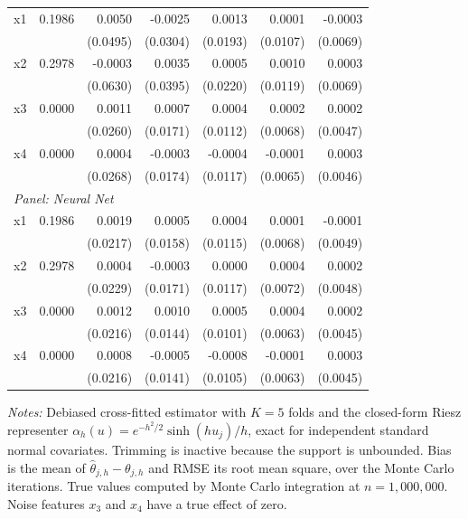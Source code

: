 \documentclass[12pt,a4paper]{article}
\numberwithin{equation}{section}
\theoremstyle{plain}
\theoremstyle{definition}
\begin{document}
\begin{table}[htbp]
\begin{threeparttable}
\begin{tabular}{lrrrrrr}
				\quad x1 & 0.1986 & 0.0050 & -0.0025 & 0.0013 & 0.0001 & -0.0003 \\
				&  & (0.0495) & (0.0304) & (0.0193) & (0.0107) & (0.0069) \\
				\quad x2 & 0.2978 & -0.0003 & 0.0035 & 0.0005 & 0.0010 & 0.0003 \\
				&  & (0.0630) & (0.0395) & (0.0220) & (0.0119) & (0.0069) \\
				\quad x3 & 0.0000 & 0.0011 & 0.0007 & 0.0004 & 0.0002 & 0.0002 \\
				&  & (0.0260) & (0.0171) & (0.0112) & (0.0068) & (0.0047) \\
				\quad x4 & 0.0000 & 0.0004 & -0.0003 & -0.0004 & -0.0001 & 0.0003 \\
				&  & (0.0268) & (0.0174) & (0.0117) & (0.0065) & (0.0046) \\
				\midrule
				\multicolumn{7}{l}{\textit{Panel: Neural Net}} \\
				\quad x1 & 0.1986 & 0.0019 & 0.0005 & 0.0004 & 0.0001 & -0.0001 \\
				&  & (0.0217) & (0.0158) & (0.0115) & (0.0068) & (0.0049) \\
				\quad x2 & 0.2978 & 0.0004 & -0.0003 & 0.0000 & 0.0004 & 0.0002 \\
				&  & (0.0229) & (0.0171) & (0.0117) & (0.0072) & (0.0048) \\
				\quad x3 & 0.0000 & 0.0012 & 0.0010 & 0.0005 & 0.0004 & 0.0002 \\
				&  & (0.0216) & (0.0144) & (0.0101) & (0.0063) & (0.0045) \\
				\quad x4 & 0.0000 & 0.0008 & -0.0005 & -0.0008 & -0.0001 & 0.0003 \\
				&  & (0.0216) & (0.0141) & (0.0105) & (0.0063) & (0.0045) \\
				\bottomrule
				\end{tabular}
				\begin{tablenotes}
				\footnotesize
				\item \textit{Notes:} Debiased cross-fitted estimator with $K=5$ folds and the closed-form Riesz representer $\alpha_h(u) = e^{-h^2/2}\sinh(h u_j)/h$, exact for independent standard normal covariates. Trimming is inactive because the support is unbounded. Bias is the mean of $\hat{\theta}_{j,h} - \theta_{j,h}$ and RMSE its root mean square, over the Monte Carlo iterations. True values computed by Monte Carlo integration at $n=1{,}000{,}000$. Noise features $x_3$ and $x_4$ have a true effect of zero.
				\end{tablenotes}
		\end{threeparttable}
	\end{table}
	
\end{document}
